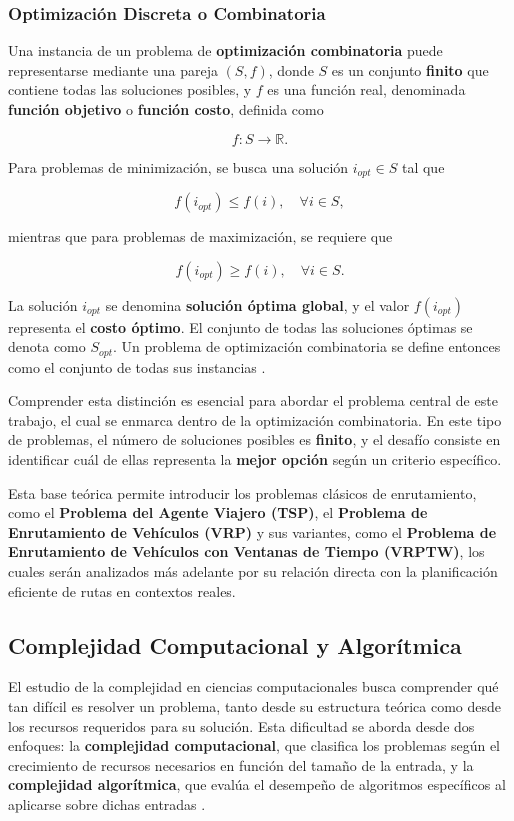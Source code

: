 \documentclass[12pt,titlepage,twoside,openright]{book}
\begin{document}
\subsubsection{Optimización Discreta o Combinatoria}
\label{subsec:opt_discreta}

Una instancia de un problema de \textbf{optimización combinatoria} puede representarse mediante una pareja \((S, f)\), donde \(S\) es un conjunto \textbf{finito} que contiene todas las soluciones posibles, y \(f\) es una función real, denominada \textbf{función objetivo} o \textbf{función costo}, definida como

\[
	f: S \to \mathbb{R}.
\]

Para problemas de minimización, se busca una solución \(i_{opt} \in S\) tal que

\[
	f(i_{opt}) \leq f(i), \quad \forall i \in S,
\]

mientras que para problemas de maximización, se requiere que

\[
	f(i_{opt}) \geq f(i), \quad \forall i \in S.
\]

La solución \(i_{opt}\) se denomina \textbf{solución óptima global}, y el valor \(f(i_{opt})\) representa el \textbf{costo óptimo}. El conjunto de todas las soluciones óptimas se denota como \(S_{opt}\). Un problema de optimización combinatoria se define entonces como el conjunto de todas sus instancias \citep{cobos2010}.

Comprender esta distinción es esencial para abordar el problema central de este trabajo, el cual se enmarca dentro de la optimización combinatoria. En este tipo de problemas, el número de soluciones posibles es \textbf{finito}, y el desafío consiste en identificar cuál de ellas representa la \textbf{mejor opción} según un criterio específico.

Esta base teórica permite introducir los problemas clásicos de enrutamiento, como el \textbf{Problema del Agente Viajero (TSP)}, el \textbf{Problema de Enrutamiento de Vehículos (VRP)} y sus variantes, como el \textbf{Problema de Enrutamiento de Vehículos con Ventanas de Tiempo (VRPTW)}, los cuales serán analizados más adelante por su relación directa con la planificación eficiente de rutas en contextos reales.

\subsection{Complejidad Computacional y Algorítmica}

El estudio de la complejidad en ciencias computacionales busca comprender qué tan difícil es resolver un problema, tanto desde su estructura teórica como desde los recursos requeridos para su solución. Esta dificultad se aborda desde dos enfoques: la \textbf{complejidad computacional}, que clasifica los problemas según el crecimiento de recursos necesarios en función del tamaño de la entrada, y la \textbf{complejidad algorítmica}, que evalúa el desempeño de algoritmos específicos al aplicarse sobre dichas entradas \citep{garey1979computers, papadimitriou1994}.
\end{document}
